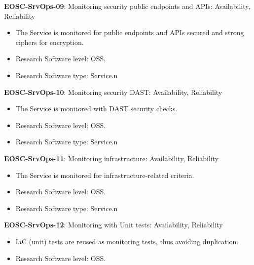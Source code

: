 \textbf{EOSC-SrvOps-09}: Monitoring security public endpoints and APIs: Availability, Reliability

\begin{itemize}
    \item The Service is monitored for public endpoints and APIs secured and strong ciphers for encryption. \cite{orviz_fernandez_eosc-synergy_2020}
    \item Research Software level: OSS.
    \item Research Software type: Service.n\end{itemize}

\textbf{EOSC-SrvOps-10}: Monitoring security DAST: Availability, Reliability

\begin{itemize}
    \item The Service is monitored with DAST security checks. \cite{orviz_fernandez_eosc-synergy_2020}
    \item Research Software level: OSS.
    \item Research Software type: Service.n\end{itemize}

\textbf{EOSC-SrvOps-11}: Monitoring infrastructure: Availability, Reliability

\begin{itemize}
    \item The Service is monitored for infrastructure-related criteria. \cite{orviz_fernandez_eosc-synergy_2020}
    \item Research Software level: OSS.
    \item Research Software type: Service.n\end{itemize}

\textbf{EOSC-SrvOps-12}: Monitoring with Unit tests: Availability, Reliability

\begin{itemize}
    \item IaC (unit) tests are reused as monitoring tests, thus avoiding duplication. \cite{orviz_fernandez_eosc-synergy_2020}
    \item Research Software level: OSS.
\end{itemize}

